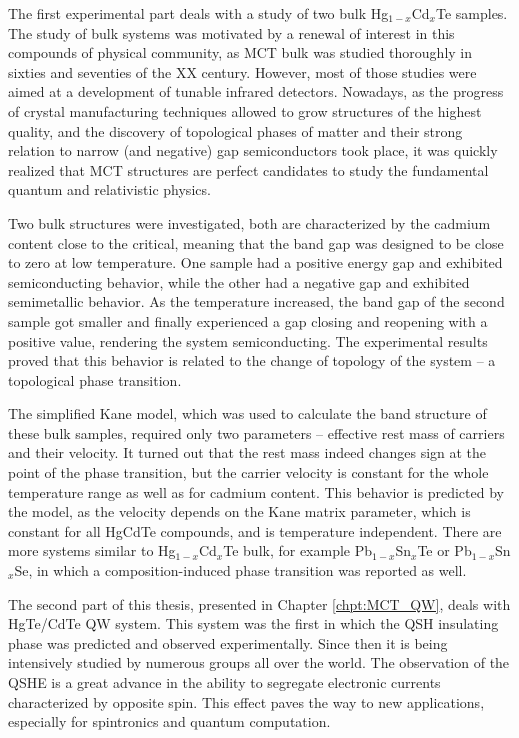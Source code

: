 \documentclass[titlepage,a4paper]{book}
\begin{document}
The first experimental part deals with a study of two bulk Hg$_{1-x}$Cd$_{x}$Te samples. The study of bulk systems was motivated by a renewal of interest in this compounds of physical community, as MCT bulk was studied thoroughly in sixties and seventies of the XX century. However, most of those studies were aimed at a development of tunable infrared detectors. Nowadays, as the progress of crystal manufacturing techniques allowed to grow structures of the highest quality, and the discovery of topological phases of matter and their strong relation to narrow (and negative) gap semiconductors took place, it was quickly realized that MCT structures are perfect candidates to study the fundamental quantum and relativistic physics. 

Two bulk structures were investigated, both are characterized by the cadmium content close to the critical, meaning that the band gap was designed to be close to zero at low temperature.
One sample had a positive energy gap and exhibited semiconducting behavior, while the other had a negative gap and exhibited semimetallic behavior. As the temperature increased, the band gap of the second sample got smaller and finally experienced a gap closing and reopening with a positive value, rendering the system semiconducting. The experimental results proved that this behavior is related to the change of topology of the system -- a topological phase transition. 

The simplified Kane model, which was used to calculate the band structure of these bulk samples, required only two parameters -- effective rest mass of carriers and their velocity. It turned out that the rest mass indeed changes sign at the point of the phase transition, but the carrier velocity is constant for the whole temperature range as well as for cadmium content. This behavior is predicted by the model, as the velocity depends on the Kane matrix parameter, which is constant for all HgCdTe compounds, and is temperature independent. There are more systems similar to Hg$_{1-x}$Cd$_{x}$Te bulk, for example Pb$_{1-x}$Sn$_{x}$Te or Pb$_{1-x}$Sn$_{x}$Se, in which a composition-induced phase transition was reported as well.

The second part of this thesis, presented in Chapter \ref{chpt:MCT_QW}, deals with HgTe/CdTe QW system. This system was the first in which the QSH insulating phase was predicted and observed experimentally. Since then it is being intensively studied by numerous groups all over the world. The observation of the QSHE is a great advance in the ability to segregate electronic currents characterized by opposite spin. This effect paves the way to new applications, especially for spintronics and quantum computation.
\end{document}
